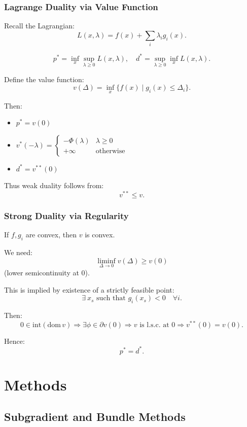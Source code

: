 \documentclass[12pt,oneside]{book}
\numberwithin{equation}{section}
\theoremstyle{definition}
\theoremstyle{plain}
\theoremstyle{remark}
\begin{document}
\subsection{Lagrange Duality via Value Function}

Recall the Lagrangian:
\[
L(x,\lambda) = f(x) + \sum_i \lambda_i g_i(x).
\]

\[
p^* = \inf_x \sup_{\lambda\ge0} L(x,\lambda),
\quad
d^* = \sup_{\lambda\ge0} \inf_x L(x,\lambda).
\]

Define the value function:
\[
v(\Delta) =
\inf_x \{ f(x) \mid g_i(x)\le \Delta_i \}.
\]

Then:
\begin{itemize}
\item[(1)] $p^* = v(0)$
\item[(2)] $v^*(-\lambda) =
\begin{cases}
-\Phi(\lambda) & \lambda\ge0 \\
+\infty & \text{otherwise}
\end{cases}$
\item[(3)] $d^* = v^{**}(0)$
\end{itemize}

Thus weak duality follows from:
\[
v^{**} \le v.
\]

\subsection{Strong Duality via Regularity}

If $f,g_i$ are convex, then $v$ is convex.

We need:
\[
\liminf_{\Delta\to0} v(\Delta) \ge v(0)
\]
(lower semicontinuity at $0$).

This is implied by existence of a strictly feasible point:
\[
\exists \ x_s \text{ such that } g_i(x_s) < 0 \quad \forall i.
\]

Then:
\[
0 \in \mathrm{int}(\mathrm{dom}\,v)
\Rightarrow
\exists \phi \in \partial v(0)
\Rightarrow
v \text{ is l.s.c. at } 0
\Rightarrow
v^{**}(0)=v(0).
\]

Hence:
\[
p^* = d^*.
\]

\chapter{Methods}

\section{Subgradient and Bundle Methods}
\end{document}
